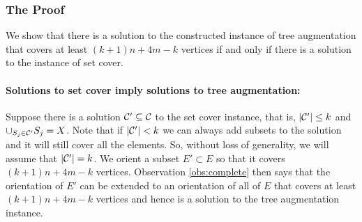 \documentclass{article}
\begin{document}
\subsubsection*{The Proof}

  We show that there is a solution to the constructed instance of {\sc
    tree augmentation} that covers at least $(k+1)n+4m-k$ vertices if and only
  if there is a solution to the instance of {\sc set cover}.

\paragraph{Solutions to {\sc set cover} imply solutions to {\sc tree
  augmentation}:}
  
Suppose there is a solution ${\cal C}'\subseteq {\cal C}$ to the {\sc
  set cover} instance, that is, $|{\cal C}'|\le k$ and $\cup_{S_j\in
  {\cal C}'} S_j = X$.  Note that if $|{\cal C}'|< k$ we can always
add subsets to the solution and it will still cover all the elements.
So, without loss of generality, we will assume that $|{\cal C}'|=k$.
We orient a subset $E' \subset E$ so that it covers $(k+1)n+4m-k$ vertices. Observation \ref{obs:complete} then says that the orientation of $E'$ can
be extended to an orientation of all of $E$ that covers at least $(k+1)n+4m-k$ vertices and
hence is a solution to the {\sc tree augmentation} instance.
\end{document}
